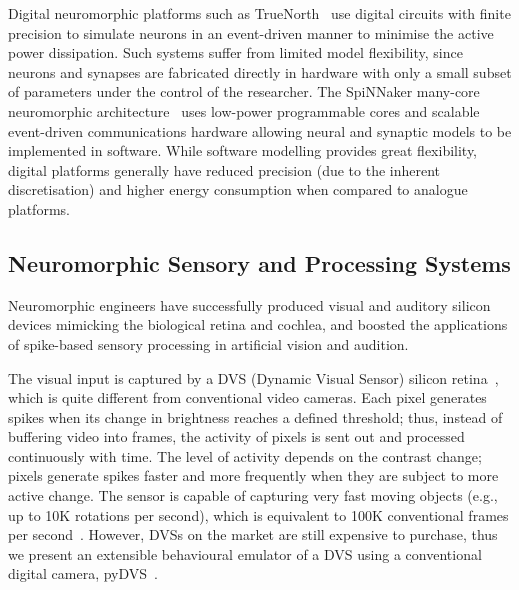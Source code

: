 Digital neuromorphic platforms such as TrueNorth~\citep{merolla2014million} use digital circuits with finite precision to simulate neurons in an event-driven manner to minimise the active power dissipation.
Such systems suffer from limited model flexibility, since neurons and synapses are fabricated directly in hardware with only a small subset of parameters under the control of the researcher.
The SpiNNaker many-core neuromorphic architecture~\citep{furber2014spinnaker} uses low-power programmable cores and scalable event-driven communications hardware allowing neural and synaptic models to be implemented in software.
While software modelling provides great flexibility, digital platforms generally have reduced precision (due to the inherent discretisation) and higher energy consumption when compared to analogue platforms.

\subsection{Neuromorphic Sensory and Processing Systems}
\label{sec:morph}
Neuromorphic engineers have successfully produced visual and auditory silicon devices mimicking the biological retina and cochlea, and boosted the applications of spike-based sensory processing in artificial vision and audition.

The visual input is captured by a DVS (Dynamic Visual Sensor) silicon retina~\citep{delbruck2008frame,serrano2013128}, which is quite different from conventional video cameras.
Each pixel generates spikes when its change in brightness reaches a defined threshold;
thus, instead of buffering video into frames, the activity of pixels is sent out and processed continuously with time.
The level of activity depends on the contrast change; pixels generate spikes faster and more frequently when they are subject to more active change.
The sensor is capable of capturing very fast moving objects (e.g., up to 10K rotations per second), which is equivalent to 100K conventional frames per second~\citep{lenero20113}.
However, DVSs on the market are still expensive to purchase, thus we present an extensible behavioural emulator of a DVS using a conventional digital camera, pyDVS~\citep{7850249}.

